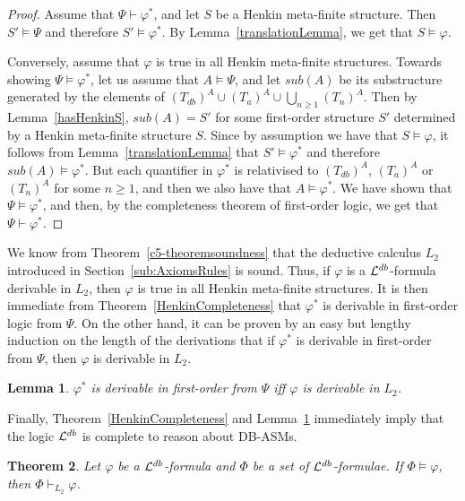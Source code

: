 \documentclass[preprint,11pt]{elsarticle}
\newtheorem{theorem}{Theorem}[section]
\newtheorem{lemma}[theorem]{Lemma}
\theoremstyle{definition}
\theoremstyle{remark}
\begin{document}
\begin{proof}
Assume that $\Psi \vdash \varphi^*$, and let $S$ be a Henkin meta-finite structure. Then $S' \models \Psi$ and therefore $S' \models \varphi^*$. By Lemma~\ref{translationLemma}, we get that $S \models \varphi$. 

Conversely, assume that $\varphi$ is true in all Henkin meta-finite structures. Towards showing $\Psi \models \varphi^*$, let us assume that $A \models \Psi$, and let $\mathit{sub}(A)$ be its substructure generated by the elements of $(T_{db})^A \cup (T_a)^A \cup \bigcup_{n \geq 1} (T_n)^A$. Then by Lemma~\ref{hasHenkinS}, $\mathit{sub}(A) = S'$ for some first-order structure $S'$ determined by a Henkin meta-finite structure $S$. Since by assumption we have that $S \models \varphi$, it follows from Lemma~\ref{translationLemma} that $S' \models \varphi^*$ and therefore $\mathit{sub}(A) \models \varphi^*$. But each quantifier in $\varphi^*$ is relativised to $(T_{db})^A$, $(T_a)^A$ or $(T_n)^A$ for some $n\geq 1$, and then we also have that $A \models \varphi^*$.  We have shown that $\Psi \models \varphi^*$, and then, by the completeness theorem of first-order logic, we get that $\Psi \vdash \varphi^*$.
\end{proof}

We know from Theorem~\ref{c5-theoremsoundness} that the deductive calculus $L_2$ introduced in Section~\ref{sub:AxiomsRules} is sound. Thus, if $\varphi$ is a ${\cal L}^{db}$-formula derivable in $L_2$, then $\varphi$ is true in all Henkin meta-finite structures. It is then immediate from Theorem~\ref{HenkinCompleteness} that $\varphi^*$ is derivable in first-order logic from $\Psi$. On the other hand, it can be proven by an easy but lengthy induction on the length of the derivations that if $\varphi^*$ is derivable in first-order from $\Psi$, then $\varphi$ is derivable in $L_2$. 

\begin{lemma}\label{derivabilityLemma}
$\varphi^*$ is derivable in first-order from $\Psi$ iff $\varphi$ is derivable in $L_2$.
\end{lemma}

Finally, Theorem~\ref{HenkinCompleteness} and Lemma~\ref{derivabilityLemma} immediately imply that the logic ${\cal L}^{db}$ is complete to reason about DB-ASMs.  

\begin{theorem} \label{thm-adtm-completeness-FOL}
Let $\varphi$ be a ${\cal L}^{db}$-formula and $\Phi$ be a set of ${\cal L}^{db}$-formulae. If $\Phi\models\varphi$, then $\Phi\vdash_{L_2}\varphi$.
\end{theorem}
\end{document}
